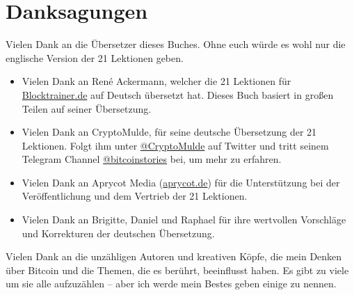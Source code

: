 \chapter*{Danksagungen}

Vielen Dank an die Übersetzer dieses Buches. Ohne euch würde es wohl nur die englische Version der
21 Lektionen geben.

\begin{itemize}
  \item Vielen Dank an René Ackermann, welcher die 21 Lektionen für
  \href{https://blocktrainer.de}{Blocktrainer.de} auf Deutsch übersetzt hat.
  Dieses Buch basiert in großen Teilen auf seiner Übersetzung.
  \item Vielen Dank an CryptoMulde, für seine deutsche Übersetzung der 21
  Lektionen. Folgt ihm unter
  \href{https://twitter.com/CryptoMulde}{@CryptoMulde} auf Twitter und tritt
  seinem Telegram Channel
  \href{https://t.me/bitcoinstories}{@bitcoinstories} bei, um mehr zu erfahren.
  \item Vielen Dank an Aprycot Media (\href{https://www.aprycot.de}{aprycot.de})
  für die Unterstützung bei der Veröffentlichung und dem Vertrieb der 21
  Lektionen.
  \item Vielen Dank an Brigitte, Daniel und Raphael für ihre wertvollen
  Vorschläge und Korrekturen der deutschen Übersetzung.
\end{itemize}


Vielen Dank an die unzähligen Autoren und kreativen Köpfe, die mein Denken über
Bitcoin und die Themen, die es berührt, beeinflusst haben. Es gibt zu viele um
sie alle aufzuzählen -- aber ich werde mein Bestes geben einige zu nennen.


